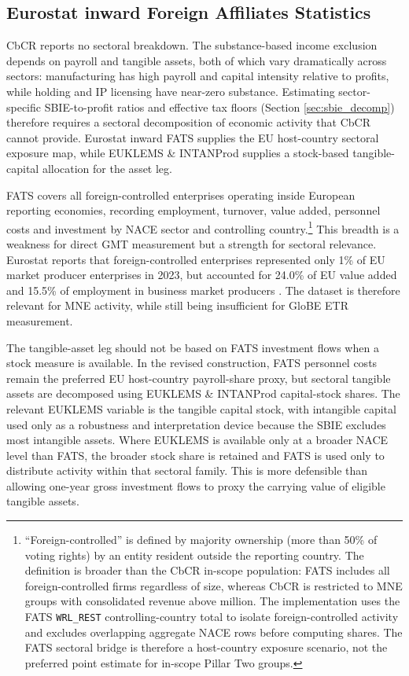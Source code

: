 \documentclass[11pt,a4paper]{article}
\newcommand{\EUR}{\texteuro}
\newcommand{\code}[1]{\texttt{#1}}
\begin{document}
\subsection{Eurostat inward Foreign Affiliates Statistics}\label{sec:fats_main}

CbCR reports no sectoral breakdown. The substance-based income exclusion depends on payroll and tangible assets, both of which vary dramatically across sectors: manufacturing has high payroll and capital intensity relative to profits, while holding and IP licensing have near-zero substance. Estimating sector-specific SBIE-to-profit ratios and effective tax floors (Section \ref{sec:sbie_decomp}) therefore requires a sectoral decomposition of economic activity that CbCR cannot provide. Eurostat inward FATS supplies the EU host-country sectoral exposure map, while EUKLEMS \& INTANProd supplies a stock-based tangible-capital allocation for the asset leg.

FATS covers all foreign-controlled enterprises operating inside European reporting economies, recording employment, turnover, value added, personnel costs and investment by NACE sector and controlling country.\footnote{``Foreign-controlled'' is defined by majority ownership (more than 50\% of voting rights) by an entity resident outside the reporting country. The definition is broader than the CbCR in-scope population: FATS includes all foreign-controlled firms regardless of size, whereas CbCR is restricted to MNE groups with consolidated revenue above \EUR750 million. The implementation uses the FATS \code{WRL\_REST} controlling-country total to isolate foreign-controlled activity and excludes overlapping aggregate NACE rows before computing shares. The FATS sectoral bridge is therefore a host-country exposure scenario, not the preferred point estimate for in-scope Pillar Two groups.} This breadth is a weakness for direct GMT measurement but a strength for sectoral relevance. Eurostat reports that foreign-controlled enterprises represented only 1\% of EU market producer enterprises in 2023, but accounted for 24.0\% of EU value added and 15.5\% of employment in business market producers \citep{eurostat2025fats}. The dataset is therefore relevant for MNE activity, while still being insufficient for GloBE ETR measurement.

The tangible-asset leg should not be based on FATS investment flows when a stock measure is available. In the revised construction, FATS personnel costs remain the preferred EU host-country payroll-share proxy, but sectoral tangible assets are decomposed using EUKLEMS \& INTANProd capital-stock shares. The relevant EUKLEMS variable is the tangible capital stock, with intangible capital used only as a robustness and interpretation device because the SBIE excludes most intangible assets. Where EUKLEMS is available only at a broader NACE level than FATS, the broader stock share is retained and FATS is used only to distribute activity within that sectoral family. This is more defensible than allowing one-year gross investment flows to proxy the carrying value of eligible tangible assets.
\end{document}
